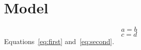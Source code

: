\documentclass{article}
\begin{document}
\section{Model}\begin{equation}a=b\label{eq:first}\end{equation}
\begin{equation}c=d\label{eq:second}\end{equation}
Equations~\eqref{eq:first} and~\eqref{eq:second}.
\end{document}
